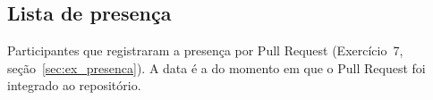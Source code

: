 \begin{anexosenv}
\partanexos

\chapter{Lista de presença}
\label{an:presenca}

Participantes que registraram a presença por Pull Request
(Exercício~7, seção~\ref{sec:ex_presenca}). A data é a do momento em que o
Pull Request foi integrado ao repositório.


\end{anexosenv}
